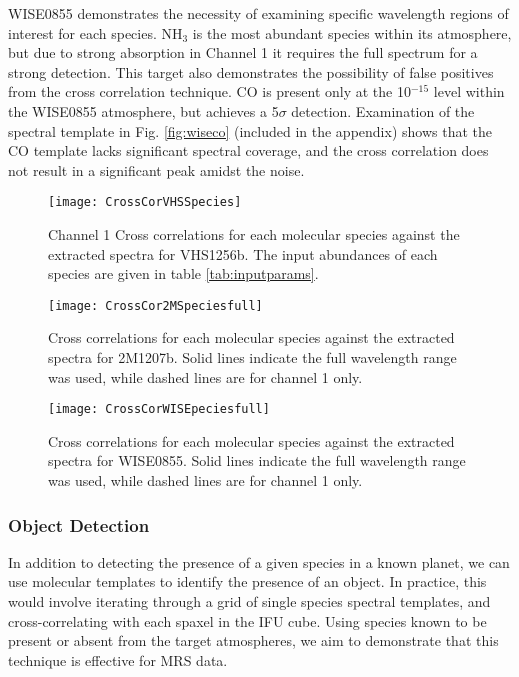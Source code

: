 WISE0855 demonstrates the necessity of examining specific wavelength regions of interest for each species.
NH$_{3}$ is the most abundant species within its atmosphere, but due to strong absorption in Channel 1 it requires the full spectrum for a strong detection.
This target also demonstrates the possibility of false positives from the cross correlation technique.
CO is present only at the 10$^{-15}$ level within the WISE0855 atmosphere, but achieves a 5$\sigma$ detection. 
Examination of the spectral template in Fig. \ref{fig:wiseco} (included in the appendix) shows that the CO template lacks significant spectral coverage, and the cross correlation does not result in a significant peak amidst the noise.
\begin{figure}[t]
	\texttt{[image: CrossCorVHSSpecies]}
	\caption{Channel 1 Cross correlations for each molecular species against the extracted spectra for VHS1256b. The input abundances of each species are given in table \ref{tab:inputparams}. }
	\label{fig:ccspecvhs}
\end{figure}
\begin{figure}[h]
	\texttt{[image: CrossCor2MSpeciesfull]}
	\caption{Cross correlations for each molecular species against the extracted spectra for 2M1207b. Solid lines indicate the full wavelength range was used, while dashed lines are for channel 1 only.}
	\label{fig:ccspec2mfull}
\end{figure}
\begin{figure}[h]
	\texttt{[image: CrossCorWISEpeciesfull]}
	\caption{Cross correlations for each molecular species against the extracted spectra for WISE0855. Solid lines indicate the full wavelength range was used, while dashed lines are for channel 1 only.}
	\label{fig:ccspecwisefull}
\end{figure}
\subsubsection{Object Detection}
In addition to detecting the presence of a given species in a known planet, we can use molecular templates to identify the presence of an object.
In practice, this would involve iterating through a grid of single species spectral templates, and cross-correlating with each spaxel in the IFU cube.
Using species known to be present or absent from the target atmospheres, we aim to demonstrate that this technique is effective for MRS data.

